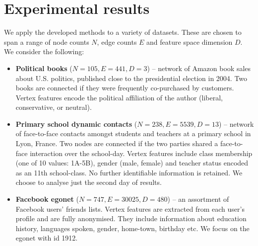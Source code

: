 \section{Experimental results}
\label{sec:experiments}

We apply the developed methods to a variety of datasets. These are chosen to span a range of node counts $N$, edge counts $E$ and feature space dimension $D$. We consider the following:

\begin{itemize}
	\item \textbf{Political books} \cite{polbooks} ($N=105, E=441, D=3$) -- network of Amazon book sales about U.S. politics, published close to the presidential election in 2004. Two books are connected if they were frequently co-purchased by customers. Vertex features encode the political affiliation of the author (liberal, conservative, or neutral).
		
	\item \textbf{Primary school dynamic contacts} \cite{schools} ($N=238, E=5539, D=13$) -- network of face-to-face contacts amongst students and teachers at a primary school in Lyon, France. Two nodes are connected if the two parties shared a face-to-face interaction over the school-day. Vertex features include class membership (one of 10 values: 1A-5B), gender (male, female) and teacher status encoded as an 11th school-class. No further identifiable information is retained. We choose to analyse just the second day of results.
	
	\item \textbf{Facebook egonet} \cite{fb-snap} ($N=747, E=30025, D=480$) -- an assortment of Facebook users' friends lists. Vertex features are extracted from each user's profile and are fully anonymised. They include information about education history, languages spoken, gender, home-town, birthday etc. We focus on the egonet with id 1912.

\end{itemize}

